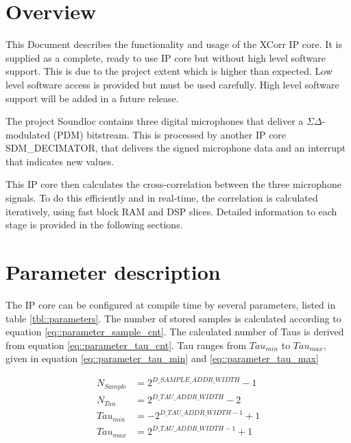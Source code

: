 


\maketitle

\section{Overview}
\label{sec:overview}

This Document describes the functionality and usage of the XCorr IP core.
It is supplied as a complete, ready to use IP core but without high level software support.
This is due to the project extent which is higher than expected.
Low level software access is provided but must be used carefully.
High level software support will be added in a future release.

The project Soundloc contains three digital microphones that deliver a $\Sigma\Delta$-modulated (PDM) bitstream.
This is processed by another IP core SDM\_DECIMATOR, that delivers the signed microphone data and an interrupt that indicates new values.

This IP core then calculates the cross-correlation between the three microphone signals.
To do this efficiently and in real-time, the correlation is calculated iteratively, using fast block RAM and DSP slices.
Detailed information to each stage is provided in the following sections.

\section{Parameter description}
\label{sec::parameters}

The IP core can be configured at compile time by several parameters, listed in table \ref{tbl::parameters}.
The number of stored samples is calculated according to equation \ref{eq::parameter_sample_cnt}.
The calculated number of Taus is derived from equation \ref{eq::parameter_tau_cnt}.
Tau ranges from $Tau_{min}$ to $Tau_{max}$, given in equation \ref{eq::parameter_tau_min} and \ref{eq::parameter_tau_max}

\begin{align}
	N_{Sample} &= 2^{D\_SAMPLE\_ADDR\_WIDTH}-1 \label{eq::parameter_sample_cnt} \\
	N_{Tau} &=2^{D\_TAU\_ADDR\_WIDTH}-2 \label{eq::parameter_tau_cnt} \\
	Tau_{min} &= -2^{D\_TAU\_ADDR\_WIDTH - 1}+1 \label{eq::parameter_tau_min} \\
	Tau_{max} &= 2^{D\_TAU\_ADDR\_WIDTH - 1}+1 \label{eq::parameter_tau_max}
\end{align}

